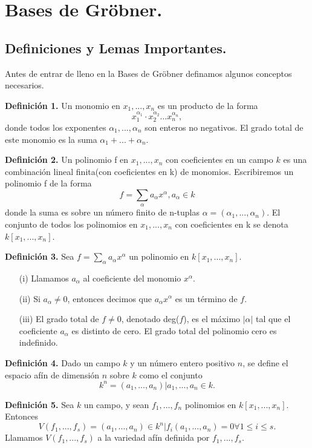 \chapter{Bases de Gröbner.}
\section{Definiciones y Lemas Importantes.}
Antes de entrar de lleno en la Bases de Gröbner definamos algunos conceptos necesarios.

\textbf{Definición 1.} Un monomio en $x_{1},..., x_{n}$ es un producto de la forma
$$x_{1}^{\alpha_{1}} \cdot x_{2}^{\alpha_{2}} \dots x_{n}^{\alpha_{n}},$$
donde todos los exponentes $\alpha_{1},...,\alpha_{n}$ son enteros no negativos. El grado total de este monomio es la suma $\alpha_{1}+...+\alpha_{n}$.

\textbf{Definición 2.} Un polinomio f en $x_{1},..., x_{n}$ con coeficientes en un campo $k$ es una combinación lineal finita(con coeficientes en k) de monomios. Escribiremos un polinomio f de la forma
$$ f = \sum_{\alpha} a_{\alpha}x^{\alpha}, a_{\alpha}\in k$$
donde la suma es sobre un número finito de n-tuplas $\alpha = (\alpha_{1},...,\alpha_{n})$. El conjunto de todos los polinomios en $x_{1},...,x_{n}$ con coeficientes en k se denota $k[x_{1},...,x_{n}]$.

\textbf{Definición 3.} Sea $f = \sum_{\alpha} a_{\alpha}x^{\alpha}$ un polinomio en $k[x_{1},...,x_{n}]$.
\begin{enumerate}
	\item [(i)]  Llamamos $a_{\alpha}$ al coeficiente del monomio $x^{\alpha}$.
	\item [(ii)]  Si $a_{\alpha} \neq 0 $, entonces decimos que $a_{\alpha}x^{\alpha}$ es un término de $f$.
	\item [(iii)] El grado total de $f \neq 0$, denotado deg($f$), es el máximo $|\alpha|$ tal que el coeficiente $a_{\alpha}$ es distinto de cero. El grado total del polinomio cero es indefinido.
\end{enumerate}

\textbf{Definición 4.} Dado un campo $k$ y un número entero positivo $n$, se define el espacio afín de dimensión $n$ sobre $k$ como el conjunto
$$k^{n}={(a_{1},...,a_{n}) | a_{1},...,a_{n} \in k }.$$

\textbf{Definición 5.} Sea $k$ un campo, y sean $f_{1},...,f_{n}$ polinomios en $k[x_{1},...,x_{n}]$. Entonces
$$V(f_{1},...,f_{s})={(a_{1},...,a_{n}) \in k^{n}|f_{i}(a_{1},...,a_{n}) = 0 \forall 1 \leq i \leq s}.$$
Llamamos $V(f_{1},...,f_{s})$ a la variedad afín definida por $f_{1},...,f_{s}$.

